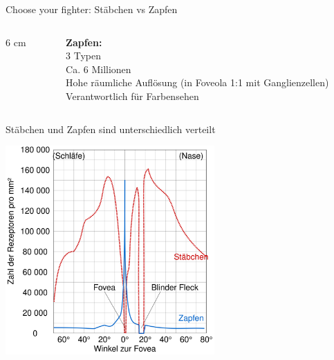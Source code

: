 \documentclass{beamer}
\begin{document}
\begin{frame}{Choose your fighter: Stäbchen vs Zapfen}
\begin{columns}[c]
\begin{column} {6 cm}
\end{column}



\begin{column}{2.5cm}

\textbf{Zapfen:} \\[0.5 cm]

3 Typen \\

Ca. 6 Millionen   \\

Hohe räumliche Auflösung (in Foveola 1:1 mit Ganglienzellen)  \\

Verantwortlich für Farbensehen \\
\end{column}


\end{columns}    
        
    \end{frame}
    
    


    
    
    \begin{frame}{Stäbchen und Zapfen sind unterschiedlich verteilt}

    \begin{center}
        \includegraphics[width=0.6\textwidth]{Human_photoreceptor_distribution.png}
    \end{center}



\end{frame}
    
    

\end{document}
